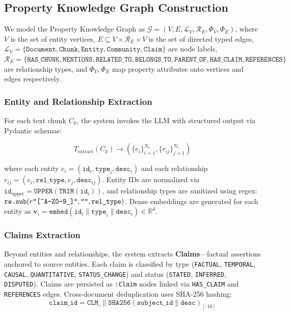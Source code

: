 \documentclass[11pt]{article}
\begin{document}
\subsection{Property Knowledge Graph Construction}

We model the Property Knowledge Graph as $\mathcal{G} = (V, E, \mathcal{L}_V, \mathcal{R}_E, \Phi_V, \Phi_E)$, where $V$ is the set of entity vertices, $E \subseteq V \times \mathcal{R}_E \times V$ is the set of directed typed edges, $\mathcal{L}_V = \{\texttt{Document}, \texttt{Chunk}, \texttt{Entity}, \texttt{Community}, \texttt{Claim}\}$ are node labels, $\mathcal{R}_E = \{\texttt{HAS\_CHUNK}, \texttt{MENTIONS}, \texttt{RELATED\_TO}, \texttt{BELONGS\_TO}, \texttt{PARENT\_OF}, \texttt{HAS\_CLAIM}, \texttt{REFERENCES}\}$ are relationship types, and $\Phi_V, \Phi_E$ map property attributes onto vertices and edges respectively.

\subsubsection{Entity and Relationship Extraction}

For each text chunk $C_k$, the system invokes the LLM with structured output via Pydantic schemas:

\begin{equation}
T_{\text{extract}}(C_k) \to \left(\{e_i\}_{i=1}^{N_e}, \{r_{ij}\}_{j=1}^{N_r}\right)
\end{equation}

where each entity $e_i = (\texttt{id}_i, \texttt{type}_i, \texttt{desc}_i)$ and each relationship $r_{ij} = (e_i, \texttt{rel\_type}, e_j, \texttt{desc}_{ij})$. Entity IDs are normalized via $\texttt{id}_{\text{upper}} = \texttt{UPPER}(\texttt{TRIM}(\texttt{id}_i))$, and relationship types are sanitized using regex: $\texttt{re.sub}(r\texttt{"[\char`\^A\text{-}Z0\text{-}9\_]"}, \texttt{""}, \texttt{rel\_type})$. Dense embeddings are generated for each entity as $\mathbf{v}_i = \texttt{embed}(\texttt{id}_i \| \texttt{type}_i \| \texttt{desc}_i) \in \mathbb{R}^d$.

\subsubsection{Claims Extraction}

Beyond entities and relationships, the system extracts \textbf{Claims}---factual assertions anchored to source entities. Each claim is classified by type (\texttt{FACTUAL}, \texttt{TEMPORAL}, \texttt{CAUSAL}, \texttt{QUANTITATIVE}, \texttt{STATUS\_CHANGE}) and status (\texttt{STATED}, \texttt{INFERRED}, \texttt{DISPUTED}). Claims are persisted as \texttt{:Claim} nodes linked via \texttt{HAS\_CLAIM} and \texttt{REFERENCES} edges. Cross-document deduplication uses SHA-256 hashing:
\begin{equation}
\texttt{claim\_id} = \texttt{CLM\_} \| \texttt{SHA256}(\texttt{subject\_id} \| \texttt{desc})_{[:16]}
\end{equation}
\end{document}
